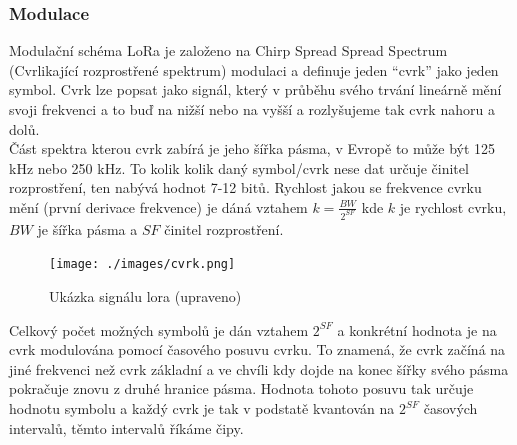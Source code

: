 \documentclass{ctuthesis}
\begin{document}
\subsubsection{Modulace}
Modulační schéma LoRa je založeno na Chirp Spread Spread Spectrum (Cvrlikající rozprostřené spektrum) modulaci  \cite{iotnetwroks2015} a definuje jeden “cvrk” jako jeden symbol. Cvrk lze popsat jako signál, který v průběhu svého trvání lineárně mění svoji frekvenci a to buď na nižší nebo na vyšší a rozlyšujeme tak cvrk nahoru a dolů.\\ 
Část spektra kterou cvrk zabírá je jeho šířka pásma, v Evropě to může být 125 kHz nebo 250 kHz. To kolik kolik daný symbol/cvrk nese dat určuje činitel rozprostření, ten nabývá hodnot 7-12 bitů. Rychlost jakou se frekvence cvrku mění (první derivace frekvence) je dáná vztahem $k = \frac{BW}{2^{SF}}$ kde $k$ je rychlost cvrku, $BW$ je šířka pásma a $SF$ činitel rozprostření.\\
\begin{figure}
\caption{Ukázka signálu lora  \cite{gr-lora2016} (upraveno)}
\texttt{[image: ./images/cvrk.png]}
\label{fig:lora12}
\end{figure}
Celkový počet možných symbolů je dán vztahem $2^{SF}$ a konkrétní hodnota je na cvrk modulována pomocí časového posuvu cvrku. To znamená, že cvrk začíná na jiné frekvenci než cvrk základní a ve chvíli kdy dojde na konec šířky svého pásma pokračuje znovu z druhé hranice pásma. Hodnota tohoto posuvu tak určuje hodnotu symbolu a každý cvrk je tak v podstatě kvantován na $2^{SF}$ časových intervalů, těmto intervalů říkáme čipy.
\end{document}
